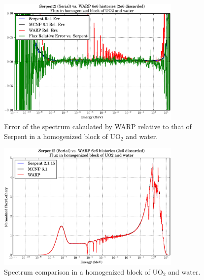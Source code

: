 \begin{figure}[h!] 
\centering
\includegraphics[width=0.8\textwidth]{graphics/finalresults/homfuel_spec_err.eps}
\caption{Error of the spectrum calculated by WARP relative to that of Serpent in a homogenized block of UO$_2$ and water. \label{homfuel_spec_err} }
\end{figure}

\begin{figure}[h!] 
\centering
\includegraphics[width=0.8\textwidth]{graphics/finalresults/homfuel_spec.eps}
\caption{Spectrum comparison in a homogenized block of UO$_2$ and water. \label{homfuel_spec} }
\end{figure}

